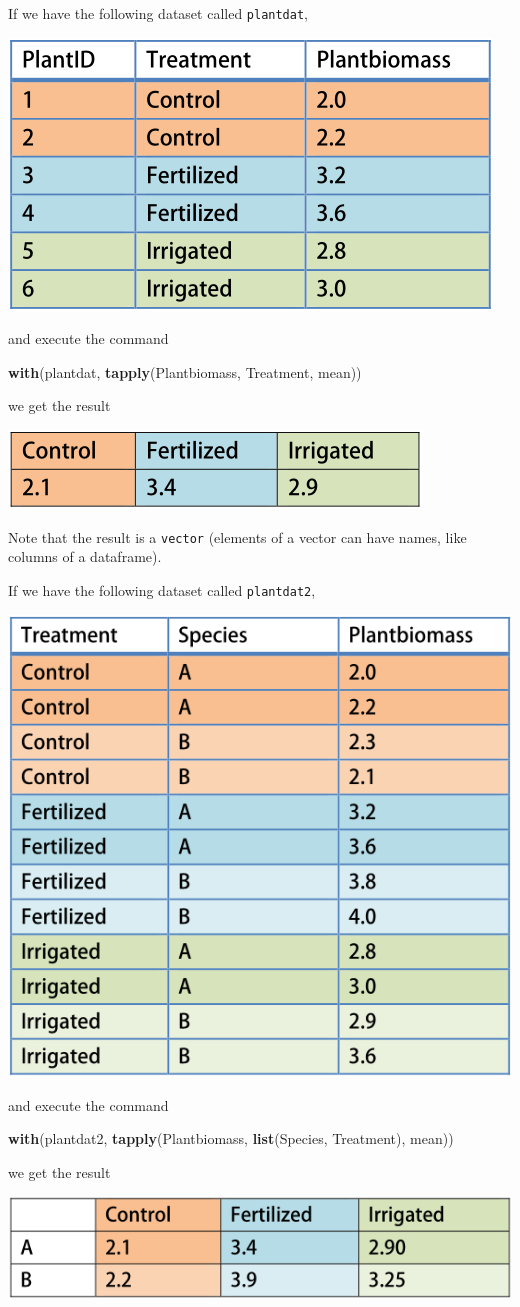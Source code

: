 \documentclass[]{book}
\newenvironment{Shaded}{\begin{snugshade}}{\end{snugshade}}
\newcommand{\KeywordTok}[1]{\textcolor[rgb]{0.13,0.29,0.53}{\textbf{#1}}}
\newcommand{\NormalTok}[1]{#1}
\begin{document}
If we have the following dataset called \texttt{plantdat},

\includegraphics[width=0.33\linewidth]{screenshots/exampledata}

and execute the command

\begin{Shaded}
\begin{Highlighting}[]
\KeywordTok{with}\NormalTok{(plantdat, }\KeywordTok{tapply}\NormalTok{(Plantbiomass, Treatment, mean))}
\end{Highlighting}
\end{Shaded}

we get the result

\includegraphics[width=0.33\linewidth]{screenshots/tapplyresult}

Note that the result is a \texttt{vector} (elements of a vector can have names, like columns of a dataframe).

If we have the following dataset called \texttt{plantdat2},

\includegraphics[width=0.33\linewidth]{screenshots/exampledatalarger}

and execute the command

\begin{Shaded}
\begin{Highlighting}[]
\KeywordTok{with}\NormalTok{(plantdat2, }\KeywordTok{tapply}\NormalTok{(Plantbiomass, }\KeywordTok{list}\NormalTok{(Species, Treatment), mean))}
\end{Highlighting}
\end{Shaded}

we get the result

\includegraphics[width=0.33\linewidth]{screenshots/tapplyresultlarger}
\end{document}
